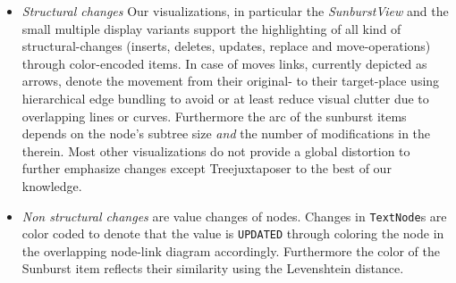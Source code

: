 \begin{itemize}
\item \emph{Structural changes} Our visualizations, in particular the \emph{SunburstView} and the small multiple display variants support the highlighting of all kind of structural-changes (inserts, deletes, updates, replace and move-operations) through color-encoded items. In case of moves links, currently depicted as arrows, denote the movement from their original- to their target-place using hierarchical edge bundling to avoid or at least reduce visual clutter due to overlapping lines or curves. Furthermore the arc of the sunburst items depends on the node's subtree size \emph{and} the number of modifications in the therein. Most other visualizations do not provide a global distortion to further emphasize changes except Treejuxtaposer to the best of our knowledge.
\item \emph{Non structural changes} are value changes of nodes. Changes in \texttt{TextNode}s are color coded to denote that the value is \texttt{UPDATED} through coloring the node in the overlapping node-link diagram accordingly. Furthermore the color of the Sunburst item reflects their similarity using the Levenshtein distance.

\end{itemize}
